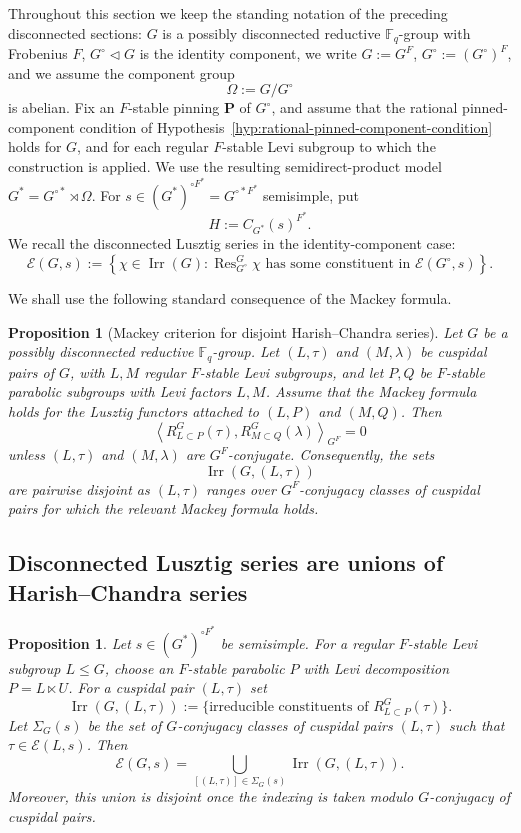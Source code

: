 \documentclass{amsart}
\theoremstyle{plain}
\numberwithin{equation}{section}
\newtheorem{proposition}[theorem]{Proposition}
\theoremstyle{definition}
\newcommand{\cE}{\mathcal{E}}
\newcommand{\Res}{\operatorname{Res}}
\newcommand{\Irr}{\operatorname{Irr}}
\newcommand{\F}{\mathbb{F}}
\begin{document}
\noindent
Throughout this section we keep the standing notation of the preceding disconnected sections:
\(G\) is a possibly disconnected reductive \(\mathbb F_q\)-group with Frobenius \(F\),
\(G^\circ\lhd G\) is the identity component, we write \(G:=G^F\),
\(G^\circ:=(G^\circ)^F\), and we assume the component group
\[
        \Omega:=G/G^\circ
\]
is abelian.  Fix an \(F\)-stable pinning \(\mathbf P\) of \(G^\circ\), and assume
that the rational pinned-component condition of
Hypothesis~\ref{hyp:rational-pinned-component-condition} holds for \(G\), and for
each regular \(F\)-stable Levi subgroup to which the construction is applied.
We use the resulting semidirect-product model
\(G^*=G^{\circ *}\rtimes\Omega\).  For
\(s\in(G^*)^{\circ F^*}=G^{\circ *F^*}\) semisimple, put
\[
        H:=C_{G^*}(s)^{F^*}.
\]
We recall the disconnected Lusztig series in the identity-component case:
\[
\cE(G,s)
:=
\left\{
\chi\in\Irr(G):
\Res^G_{G^\circ}\chi\text{ has some constituent in }\cE(G^\circ,s)
\right\}.
\]

\medskip
We shall use the following standard consequence of the Mackey formula.

\begin{proposition}[Mackey criterion for disjoint Harish--Chandra series]
\label{prop:disjoint-HC-series-disconnected}
Let \(G\) be a possibly disconnected reductive \(\F_q\)-group.  Let
\((L,\tau)\) and \((M,\lambda)\) be cuspidal pairs of \(G\), with \(L,M\)
regular \(F\)-stable Levi subgroups, and let \(P,Q\) be \(F\)-stable
parabolic subgroups with Levi factors \(L,M\).  Assume that the Mackey
formula holds for the Lusztig functors attached to \((L,P)\) and
\((M,Q)\).  Then
\[
\left\langle
R^G_{L\subset P}(\tau),
R^G_{M\subset Q}(\lambda)
\right\rangle_{G^F}
=0
\]
unless \((L,\tau)\) and \((M,\lambda)\) are \(G^F\)-conjugate.  Consequently,
the sets
\[
\Irr(G,(L,\tau))
\]
are pairwise disjoint as \((L,\tau)\) ranges over \(G^F\)-conjugacy classes
of cuspidal pairs for which the relevant Mackey formula holds.
\end{proposition}

\subsection{Disconnected Lusztig series are unions of Harish--Chandra series}
\begin{proposition}
\label{prop:disc-Lusztig-union-HC}
Let \(s\in (G^*)^{\circ F^*}\) be semisimple.
For a regular \(F\)-stable Levi subgroup \(L\leq G\), choose an \(F\)-stable
parabolic \(P\) with Levi decomposition \(P=L\ltimes U\).  For a cuspidal pair
\((L,\tau)\) set
\[
\Irr(G,(L,\tau))
:=
\{\text{irreducible constituents of }R^G_{L\subset P}(\tau)\}.
\]
Let \(\Sigma_G(s)\) be the set of \(G\)-conjugacy classes of cuspidal pairs
\((L,\tau)\) such that \(\tau\in\cE(L,s)\).  Then
\[
\cE(G,s)
=
\bigcup_{[(L,\tau)]\in\Sigma_G(s)}\Irr(G,(L,\tau)).
\]
Moreover, this union is disjoint once the indexing is taken modulo
\(G\)-conjugacy of cuspidal pairs.
\end{proposition}
\end{document}
